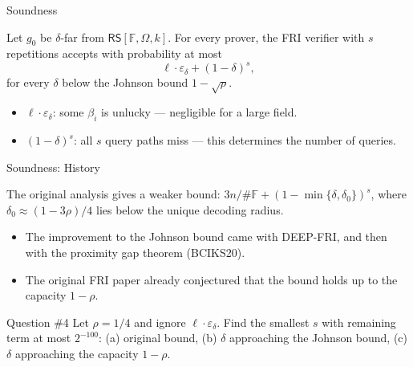 \documentclass{zkdl-presentation-template}
\begin{document}
    \begin{frame}{Soundness}
        \begin{theorem}
            Let $g_0$ be $\delta$-far from $\mathsf{RS}[\mathbb{F}, \Omega, k]$. For every prover, the FRI verifier with $s$ repetitions accepts with probability at most
            \begin{equation*}
                \ell \cdot \varepsilon_\delta + (1 - \delta)^s,
            \end{equation*}
            for every $\delta$ below the Johnson bound $1 - \sqrt{\rho}$.
        \end{theorem}
        \pause
        \begin{itemize}
            \item $\ell \cdot \varepsilon_\delta$: some $\beta_i$ is unlucky --- negligible for a large field.
            \item $(1 - \delta)^s$: all $s$ query paths miss --- this determines the number of queries.
        \end{itemize}
    \end{frame}

    \begin{frame}{Soundness: History}
        \begin{remark}
            The original analysis gives a weaker bound: $3n/\#\mathbb{F} + (1 - \min\{\delta, \delta_0\})^s$, where $\delta_0 \approx (1 - 3\rho)/4$ lies below the unique decoding radius.
        \end{remark}
        \pause
        \begin{itemize}
            \item The improvement to the Johnson bound came with DEEP-FRI, and then with the proximity gap theorem (BCIKS20).\pause
            \item The original FRI paper already conjectured that the bound holds up to the capacity $1 - \rho$.
        \end{itemize}
        \pause

        \begin{questionblock}{Question \#4}
            Let $\rho = 1/4$ and ignore $\ell \cdot \varepsilon_\delta$. Find the smallest $s$ with remaining term at most $2^{-100}$: (a) original bound, (b) $\delta$ approaching the Johnson bound, (c) $\delta$ approaching the capacity $1 - \rho$.
        \end{questionblock}
    \end{frame}
\end{document}
